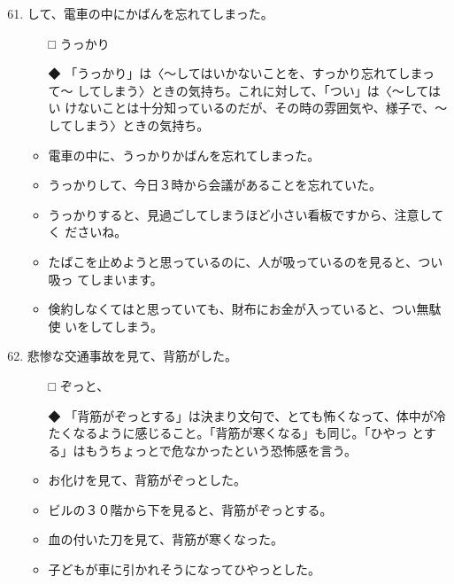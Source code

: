 \documentclass[
uplatex,
b5paper,
10pt,
dvipdfmx
]{jsbook}
\begin{document}
\begin{enumerate}
\setcounter{enumi}{60}

\item \underline{\hspace{3zw}}して、電車の中にかばんを忘れてしまった。
\begin{itemize}
\item[□] うっかり
\item[◆] 「うっかり」は〈〜してはいかないことを、すっかり忘れてしまって〜
	  してしまう〉ときの気持ち。これに対して、「つい」は〈〜してはい
	  けないことは十分知っているのだが、その時の雰囲気や、様子で、〜
	  してしまう〉ときの気持ち。
\end{itemize}
\begin{itemize}
\item 電車の中に、うっかりかばんを忘れてしまった。
\item うっかりして、今日３時から会議があることを忘れていた。
\item うっかりすると、見過ごしてしまうほど小さい看板ですから、注意してく
      ださいね。
\item たばこを止めようと思っているのに、人が吸っているのを見ると、つい吸っ
      てしまいます。
\item 倹約しなくてはと思っていても、財布にお金が入っていると、つい無駄使
      いをしてしまう。
\end{itemize}

\item 悲惨な交通事故を見て、背筋が\underline{\hspace{3zw}}した。
\begin{itemize}
\item[□] ぞっと、
\item[◆] 「背筋がぞっとする」は決まり文句で、とても怖くなって、体中が冷
	  たくなるように感じること。「背筋が寒くなる」も同じ。「ひやっ
	  とする」はもうちょ{}っとで危なかったという恐怖感を言う。
\end{itemize}
\begin{itemize}
\item お化けを見て、背筋がぞっとした。
\item ビルの３０階から下を見ると、背筋がぞっとする。
\item 血の付いた刀を見て、背筋が寒くなった。
\item 子どもが車に引かれそうになってひやっとした。
\end{itemize}


\end{enumerate}
\end{document}
